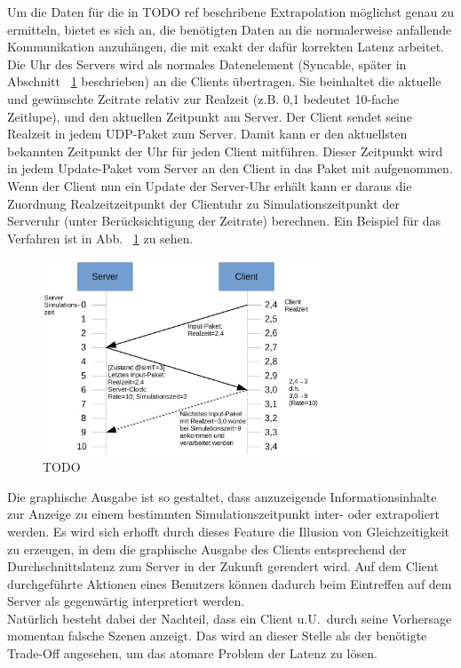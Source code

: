 Um die Daten für die in TODO ref beschribene Extrapolation möglichst genau zu ermitteln, bietet es sich an, die benötigten Daten an die normalerweise anfallende Kommunikation anzuhängen, die mit exakt der dafür korrekten Latenz arbeitet. Die Uhr des Servers wird als normales Datenelement (Syncable, später in Abschnitt ~\ref{fig:zeichnung3a} beschrieben) an die Clients übertragen. Sie beinhaltet die aktuelle und gewünschte Zeitrate relativ zur Realzeit (z.B. 0,1 bedeutet 10-fache Zeitlupe), und den aktuellen Zeitpunkt am Server. Der Client sendet seine Realzeit in jedem UDP-Paket zum Server. Damit kann er den aktuellsten bekannten Zeitpunkt der Uhr für jeden Client mitführen. Dieser Zeitpunkt wird in jedem Update-Paket vom Server an den Client in das Paket mit aufgenommen. Wenn der Client nun ein Update der Server-Uhr erhält kann er daraus die Zuordnung Realzeitzeitpunkt der Clientuhr zu Simulationszeitpunkt der Serveruhr (unter Berücksichtigung der Zeitrate) berechnen. Ein Beispiel für das Verfahren ist in Abb. ~\ref{fig:zeichnung3a} zu sehen.
\begin{figure}
    \centering
    \includegraphics[width=0.75\textwidth]{./Zeichnung3a.png}
    \caption{TODO}
    \label{fig:zeichnung3a}
\end{figure}




Die graphische Ausgabe ist so gestaltet, dass anzuzeigende Informationsinhalte zur Anzeige zu einem bestimmten Simulationszeitpunkt inter- oder extrapoliert werden.
Es wird sich erhofft durch dieses Feature die Illusion von Gleichzeitigkeit zu erzeugen, in dem die graphische Ausgabe des Clients entsprechend der Durchschnittslatenz zum Server in der Zukunft gerendert wird. Auf dem Client durchgeführte Aktionen eines Benutzers können dadurch beim Eintreffen auf dem Server als gegenwärtig interpretiert werden.\\
Natürlich besteht dabei der Nachteil, dass ein Client u.U.~durch seine Vorhersage momentan falsche Szenen anzeigt. Das wird an dieser Stelle als der benötigte Trade-Off angesehen, um das atomare Problem der Latenz zu lösen.

